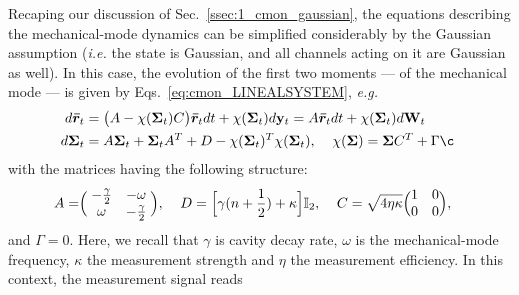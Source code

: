 Recaping our discussion of Sec.~\ref{ssec:1_cmon_gaussian}, the equations describing the mechanical-mode dynamics can be simplified considerably by the Gaussian assumption (\textit{i.e.} the state is Gaussian, and all channels acting on it are Gaussian as well). In this case, the evolution of the first two moments --- of the mechanical mode --- is given by Eqs.~\ref{eq:cmon_LINEALSYSTEM}, \textit{e.g.}
\begin{align}\label{eq:cmon_LINEALSYSTEM}
d\rbar_t &= \big(A - \chi(\cov_t) C\big) \rbar_t dt + \chi(\cov_t) \dyt = A \rbar_t dt + \chi(\cov_t) \dwt \\
d\cov_t &= A \cov_t + \cov_t A^T + D - \chi(\cov_t)^T \chi(\cov_t), \spacee \chi(\cov) = \cov C^T + \Gamma \nonumber¸
\end{align}
with the matrices having the following structure:
\begin{align}\label{eq:LINEAL_MECH_EQSBIS}
A =& \Big(\;\begin{matrix}-\frac{\gamma}{2}& -\omega\\\omega & -\frac{\gamma}{2}\end{matrix}\;\Big), \;\;\;\;
D = \Big[\gamma (n + \frac{1}{2}) + \kappa \Big]\mathbb{I}_2, \;\;\;\;  C = \sqrt{4 \eta \kappa} \Big(\begin{matrix}1&0\\0&0\end{matrix}\Big),
\end{align}
and $\Gamma=0$.
Here, we recall that $\gamma$ is cavity decay rate, $\omega$ is the mechanical-mode frequency, $\kappa$ the measurement strength and $\eta$ the measurement efficiency. In this context, the measurement signal reads

